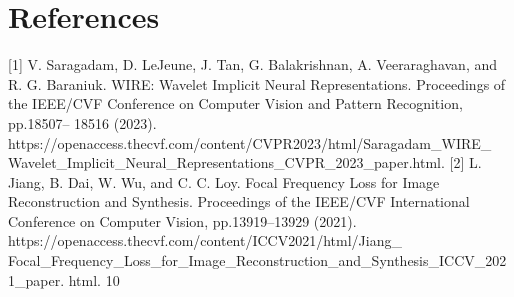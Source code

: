 \documentclass[11pt]{article}
\begin{document}
\section*{References}

[1] V. Saragadam, D. LeJeune, J. Tan, G. Balakrishnan, A. Veeraraghavan, and
R. G. Baraniuk. WIRE: Wavelet Implicit Neural Representations. Proceedings of
the IEEE/CVF Conference on Computer Vision and Pattern Recognition, pp.18507–
18516 (2023). https://openaccess.thecvf.com/content/CVPR2023/html/Saragadam\_WIRE\_
Wavelet\_Implicit\_Neural\_Representations\_CVPR\_2023\_paper.html.
[2] L. Jiang, B. Dai, W. Wu, and C. C. Loy. Focal Frequency Loss for Image Reconstruction
and Synthesis. Proceedings of the IEEE/CVF International Conference on Computer Vision,
pp.13919–13929 (2021). https://openaccess.thecvf.com/content/ICCV2021/html/Jiang\_
Focal\_Frequency\_Loss\_for\_Image\_Reconstruction\_and\_Synthesis\_ICCV\_2021\_paper.
html.
10
\end{document}
